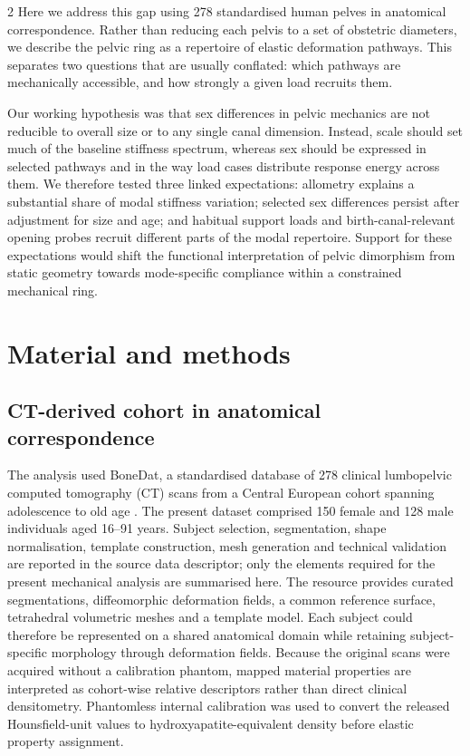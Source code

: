 \documentclass[openacc]{rsproca_new}
\begin{document}
\begin{multicols}{2}
Here we address this gap using 278 standardised human pelves in anatomical correspondence. Rather than reducing each pelvis to a set of obstetric diameters, we describe the pelvic ring as a repertoire of elastic deformation pathways. This separates two questions that are usually conflated: which pathways are mechanically accessible, and how strongly a given load recruits them.

Our working hypothesis was that sex differences in pelvic mechanics are not reducible to overall size or to any single canal dimension. Instead, scale should set much of the baseline stiffness spectrum, whereas sex should be expressed in selected pathways and in the way load cases distribute response energy across them. We therefore tested three linked expectations: allometry explains a substantial share of modal stiffness variation; selected sex differences persist after adjustment for size and age; and habitual support loads and birth-canal-relevant opening probes recruit different parts of the modal repertoire. Support for these expectations would shift the functional interpretation of pelvic dimorphism from static geometry towards mode-specific compliance within a constrained mechanical ring.

\section{Material and methods}

\subsection{CT-derived cohort in anatomical correspondence}

The analysis used BoneDat, a standardised database of 278 clinical lumbopelvic computed tomography (CT) scans from a Central European cohort spanning adolescence to old age \cite{HenysKuchar2025}. The present dataset comprised 150 female and 128 male individuals aged 16--91 years. Subject selection, segmentation, shape normalisation, template construction, mesh generation and technical validation are reported in the source data descriptor; only the elements required for the present mechanical analysis are summarised here. The resource provides curated segmentations, diffeomorphic deformation fields, a common reference surface, tetrahedral volumetric meshes and a template model. Each subject could therefore be represented on a shared anatomical domain while retaining subject-specific morphology through deformation fields. Because the original scans were acquired without a calibration phantom, mapped material properties are interpreted as cohort-wise relative descriptors rather than direct clinical densitometry. Phantomless internal calibration was used to convert the released Hounsfield-unit values to hydroxyapatite-equivalent density before elastic property assignment.


\end{multicols}
\end{document}
